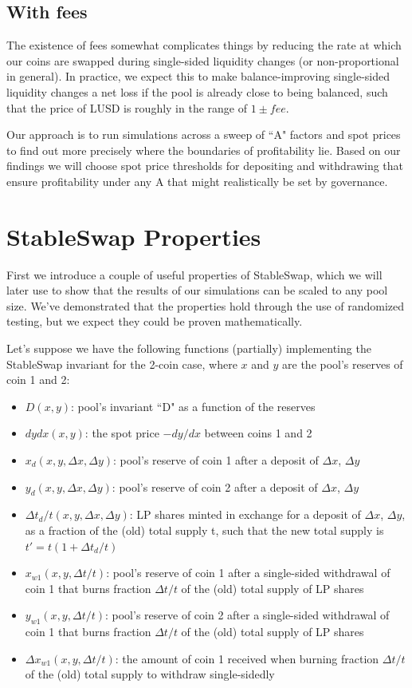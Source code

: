 \documentclass{article}
\begin{document}
\subsection{With fees}

The existence of fees somewhat complicates things by reducing the rate at which our coins are swapped during single-sided liquidity changes (or non-proportional in general). In practice, we expect this to make balance-improving single-sided liquidity changes a net loss if the pool is already close to being balanced, such that the price of LUSD is roughly in the range of $1 \pm fee$.

Our approach is to run simulations across a sweep of ``A" factors and spot prices to find out more precisely where the boundaries of profitability lie. Based on our findings we will choose spot price thresholds for depositing and withdrawing that ensure profitability under any A that might realistically be set by governance.

\section{StableSwap Properties}

First we introduce a couple of useful properties of StableSwap, which we will later use to show that the results of our simulations can be scaled to any pool size. We've demonstrated that the properties hold through the use of randomized testing, but we expect they could be proven mathematically.

Let's suppose we have the following functions (partially) implementing the StableSwap invariant for the 2-coin case, where $x$ and $y$ are the pool's reserves of coin 1 and 2:

\begin{itemize}
\item $D(x, y)$: pool's invariant ``D" as a function of the reserves
\item $dydx(x, y)$: the spot price $-dy/dx$ between coins 1 and 2
\item $x_d(x, y, \Delta{x}, \Delta{y})$: pool's reserve of coin 1 after a deposit of $\Delta{x}$, $\Delta{y}$
\item $y_d(x, y, \Delta{x}, \Delta{y})$: pool's reserve of coin 2 after a deposit of $\Delta{x}$, $\Delta{y}$
\item $\Delta{t}_d/t(x, y, \Delta{x}, \Delta{y})$: LP shares minted in exchange for a deposit of $\Delta{x}$, $\Delta{y}$, as a fraction of the (old) total supply t, such that the new total supply is $t' = t(1 + \Delta{t}_d/t)$
\item $x_{w1}(x, y, \Delta{t}/t)$: pool's reserve of coin 1 after a single-sided withdrawal of coin 1 that burns fraction $\Delta{t}/t$ of the (old) total supply of LP shares
\item $y_{w1}(x, y, \Delta{t}/t)$: pool's reserve of coin 2 after a single-sided withdrawal of coin 1 that burns fraction $\Delta{t}/t$ of the (old) total supply of LP shares
\item $\Delta{x}_{w1}(x, y, \Delta{t}/t)$: the amount of coin 1 received when burning fraction $\Delta{t}/t$ of the (old) total supply to withdraw single-sidedly
\end{itemize}
\end{document}
